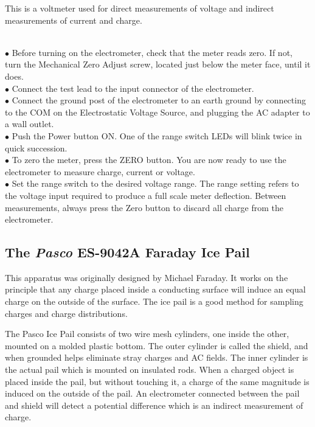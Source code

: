 {{This is a voltmeter used for direct measurements of voltage
and indirect measurements of current and charge. \\

 \vspace{0.2cm}

\\
$\bullet$ Before turning on the electrometer, check that the meter
reads zero.  If not, turn the Mechanical Zero Adjust screw,
located just below the meter face, until it does.\\
$\bullet$ Connect the test lead to the input connector of the
electrometer.\\
$\bullet$ Connect the ground post of the electrometer to an earth
ground by connecting to the COM on the Electrostatic Voltage Source, and plugging the AC
adapter to a wall outlet.\\
$\bullet$ Push the Power button ON.  One of the range switch LEDs
will blink twice in quick succession.\\
$\bullet$ To zero the meter, press the ZERO button.  You are now
ready to use the electrometer to measure charge, current or
voltage.\\
$\bullet$ Set the range switch to the desired voltage range.  The
range setting refers to the voltage input required to produce a
full scale meter deflection.  Between measurements, always press
the Zero button to discard all charge from the electrometer.

\subsection{The {\it Pasco} ES-9042A Faraday Ice Pail}
This apparatus was originally designed by Michael Faraday.  It
works on the principle that any charge placed inside a conducting
surface will induce an equal charge on the outside of the surface.
The ice pail is a good method for sampling charges and charge
distributions.

The Pasco Ice Pail consists of two wire mesh cylinders, one inside
the other, mounted on a molded plastic bottom.  The outer cylinder
is called the shield, and when grounded helps eliminate stray
charges and AC fields.  The inner cylinder is the actual pail
which is mounted on insulated rods.  When a charged object is
placed inside the pail, but without touching it, a charge of the
same magnitude is induced on the outside of the pail.  An
electrometer connected between the pail and shield will detect a
potential difference which is an indirect measurement of charge.


}}
